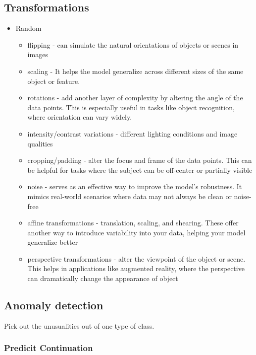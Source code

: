 \documentclass[11pt]{article}
\begin{document}
\subsection{Transformations}

\begin{itemize}
    \item Random 
    \begin{itemize}
        \item flipping - can simulate the natural orientations of objects or scenes in images
        \item scaling - It helps the model generalize across different sizes of the same object or feature.
        \item rotations - add another layer of complexity by altering the angle of the data points. This is especially useful in tasks like object recognition, where orientation can vary widely.
        \item intensity/contrast variations - different lighting conditions and image qualities
        \item cropping/padding - alter the focus and frame of the data points. This can be helpful for tasks where the subject can be off-center or partially visible
        \item noise - serves as an effective way to improve the model's robustness. It mimics real-world scenarios where data may not always be clean or noise-free
        \item affine transformations - translation, scaling, and shearing. These offer another way to introduce variability into your data, helping your model generalize better
        \item perspective transformations -  alter the viewpoint of the object or scene. This helps in applications like augmented reality, where the perspective can dramatically change the appearance of object
    \end{itemize}
\end{itemize}

\subsection{Anomaly detection}

Pick out the unusualities out of one type of class. 

\subsubsection{Predicit Continuation}
\end{document}
